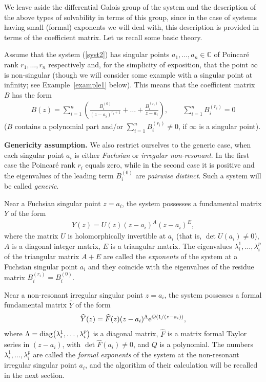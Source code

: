 \documentclass[pdftex]{sigma}
\numberwithin{equation}{section}
\begin{document}
We leave aside the differential Galois group of the system and the description of the above types of solvability in terms of
this group, since in the case of systems having small (formal) exponents we will deal with, this description is provided in
terms of the coefficient matrix. Let us recall some basic theory.

Assume that the system (\ref{syst2}) has singular points $a_1,\ldots,a_n\in\mathbb C$ of Poincar\'e rank $r_1,\ldots,r_n$
respectively and, for the simplicity of exposition, that the point $\infty$ is non-singular (though we will consider some example with a singular point at infinity; see Example~\ref{example1} below). This means that the coefficient matrix $B$ has the form
\begin{gather}\label{matrix2}
B(z)=\sum_{i=1}^n\left(\frac{B^{(0)}_i}{(z-a_i)^{r_i+1}}+\dots+\frac{B^{(r_i)}_i}{z-a_i}\right), \qquad
\sum_{i=1}^nB^{(r_i)}_i=0
\end{gather}
($B$ contains a polynomial part and/or $\sum\limits_{i=1}^nB^{(r_i)}_i\ne0$, if $\infty$ is a singular point).
\medskip

{\bf Genericity assumption.} We also restrict ourselves to the generic case, when each singular point $a_i$ is either
{\it Fuchsian} or {\it irregular non-resonant}. In the first case the Poincar\'e rank $r_i$ equals zero, while in the second
case it is positive and the eigenvalues of the leading term $B^{(0)}_i$ are {\it pairwise distinct}. Such a system will be
called {\it generic}.
\medskip

Near a Fuchsian singular point $z=a_i$, the system possesses a fundamental matrix $Y$ of the form
\begin{gather*}
Y(z)=U(z)(z-a_i)^A(z-a_i)^E,
\end{gather*}
where the matrix $U$ is holomorphically invertible at $a_i$ (that is, $\det U(a_i)\ne0$), $A$ is a diagonal integer matrix,
$E$ is a triangular matrix. The eigenvalues $\lambda_i^1,\ldots,\lambda_i^p$ of the triangular matrix $A+E$ are called the
{\it exponents} of the system at a Fuchsian singular point $a_i$ and they coincide with the eigenvalues of the residue matrix
$B^{(r_i)}_i=B^{(0)}_i$.

Near a non-resonant irregular singular point $z=a_i$, the system possesses a formal fundamental matrix $\widehat Y$ of the form
\begin{gather}\label{ffm}
\widehat Y(z)=\widehat F(z)(z-a_i)^{\Lambda} {\rm e}^{Q(1/(z-a_i))},
\end{gather}
where $\Lambda={\rm diag}\big(\lambda_i^1,\ldots,\lambda_i^p\big)$ is a diagonal matrix, $\widehat F$ is a matrix formal Taylor series
in $(z-a_i)$, with $\det\widehat F(a_i)\ne0$, and $Q$ is a polynomial. The numbers $\lambda_i^1,\ldots,\lambda_i^p$ are called
the {\it formal exponents} of the system at the non-resonant irregular singular point $a_i$, and the algorithm of their calculation will be recalled in the next section.
\end{document}
